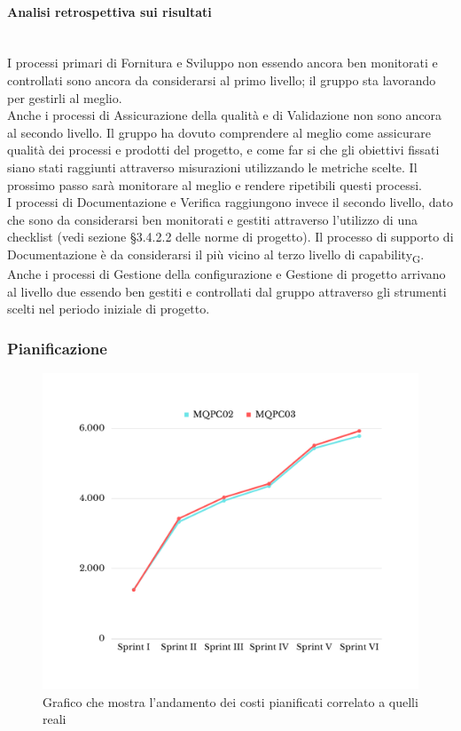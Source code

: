 \paragraph{Analisi retrospettiva sui risultati}\mbox{}\\
I processi primari di Fornitura e Sviluppo non essendo ancora ben monitorati e controllati sono ancora da considerarsi al primo livello; il gruppo sta lavorando per gestirli al meglio.\\
Anche i processi di Assicurazione della qualità e di Validazione non sono ancora al secondo livello. Il gruppo ha dovuto comprendere al meglio come assicurare qualità dei processi e prodotti del progetto, e come far si che gli obiettivi fissati siano stati raggiunti attraverso misurazioni utilizzando le metriche scelte. Il prossimo passo sarà monitorare al meglio e rendere ripetibili questi processi.\\
I processi di Documentazione e Verifica raggiungono invece il secondo livello, dato che sono da considerarsi ben monitorati e gestiti attraverso l'utilizzo di una checklist (vedi sezione §3.4.2.2 delle norme di progetto). Il processo di supporto di Documentazione è da considerarsi il più vicino al terzo livello di capability\textsubscript{G}.\\
Anche i processi di Gestione della configurazione e Gestione di progetto arrivano al livello due essendo ben gestiti e controllati dal gruppo attraverso gli strumenti scelti nel periodo iniziale di progetto.
\subsubsection{Pianificazione}
\begin{figure}[H]
	\centering
	\includegraphics[scale=0.5]{img/BCWS-ACWS.png}
	\caption{Grafico che mostra l'andamento dei costi pianificati correlato a quelli reali}
\end{figure}
